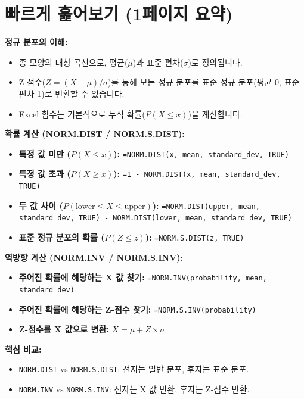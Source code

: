 \documentclass[11pt,a4paper]{article}
\begin{document}
\newpage
\section{빠르게 훑어보기 (1페이지 요약)}

\begin{tcolorbox}[colback=myblue!10!white, colframe=myblue!75!black, title=\textbf{Excel을 활용한 정규 분포 분석 핵심 요약}]
    \textbf{정규 분포의 이해:}
    \begin{itemize}
        \item 종 모양의 대칭 곡선으로, 평균($\mu$)과 표준 편차($\sigma$)로 정의됩니다.
        \item Z-점수($Z = (X - \mu) / \sigma$)를 통해 모든 정규 분포를 표준 정규 분포(평균 0, 표준 편차 1)로 변환할 수 있습니다.
        \item Excel 함수는 기본적으로 누적 확률($P(X \le x)$)을 계산합니다.
    \end{itemize}

    \textbf{확률 계산 (NORM.DIST / NORM.S.DIST):}
    \begin{itemize}
        \item \textbf{특정 값 미만 ($P(X \le x)$):}
        \texttt{=NORM.DIST(x, mean, standard\_dev, TRUE)}
        \item \textbf{특정 값 초과 ($P(X \ge x)$):}
        \texttt{=1 - NORM.DIST(x, mean, standard\_dev, TRUE)}
        \item \textbf{두 값 사이 ($P(\text{lower} \le X \le \text{upper})$):}
        \texttt{=NORM.DIST(upper, mean, standard\_dev, TRUE) - NORM.DIST(lower, mean, standard\_dev, TRUE)}
        \item \textbf{표준 정규 분포의 확률 ($P(Z \le z)$):}
        \texttt{=NORM.S.DIST(z, TRUE)}
    \end{itemize}

    \textbf{역방향 계산 (NORM.INV / NORM.S.INV):}
    \begin{itemize}
        \item \textbf{주어진 확률에 해당하는 X 값 찾기:}
        \texttt{=NORM.INV(probability, mean, standard\_dev)}
        \item \textbf{주어진 확률에 해당하는 Z-점수 찾기:}
        \texttt{=NORM.S.INV(probability)}
        \item \textbf{Z-점수를 X 값으로 변환:}
        $X = \mu + Z \times \sigma$
    \end{itemize}

    \textbf{핵심 비교:}
    \begin{itemize}
        \item \texttt{NORM.DIST} vs \texttt{NORM.S.DIST}: 전자는 일반 분포, 후자는 표준 분포.
        \item \texttt{NORM.INV} vs \texttt{NORM.S.INV}: 전자는 X 값 반환, 후자는 Z-점수 반환.
    \end{itemize}
\end{tcolorbox}
\end{document}
